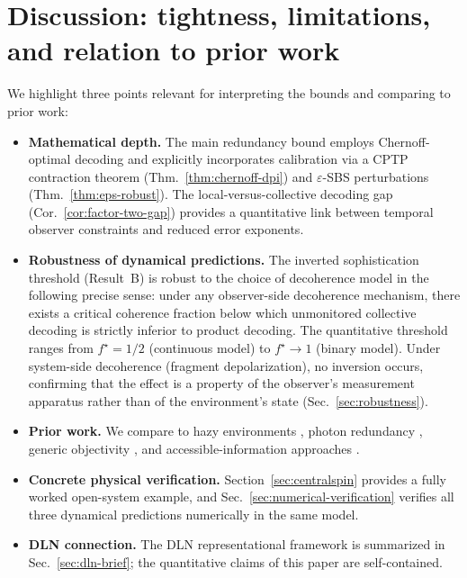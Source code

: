 \documentclass[11pt]{article}
\newcommand{\1}{\mathbf{1}}
\theoremstyle{definition}
\theoremstyle{plain}
\begin{document}
\section{Discussion: tightness, limitations, and relation to prior work}

We highlight three points relevant for interpreting the bounds and comparing to prior work:

\begin{itemize}[leftmargin=2em]
\item \textbf{Mathematical depth.}  The main redundancy bound employs Chernoff-optimal decoding \citep{Audenaert2007,NussbaumSzkola2009} and explicitly incorporates calibration via a CPTP contraction theorem (Thm.~\ref{thm:chernoff-dpi}) and $\varepsilon$-SBS perturbations (Thm.~\ref{thm:eps-robust}).
The local-versus-collective decoding gap (Cor.~\ref{cor:factor-two-gap}) provides a quantitative link between temporal observer constraints and reduced error exponents.
\item \textbf{Robustness of dynamical predictions.}  The inverted sophistication threshold (Result~B) is robust to the choice of decoherence model in the following precise sense: under any observer-side decoherence mechanism, there exists a critical coherence fraction below which unmonitored collective decoding is strictly inferior to product decoding.  The quantitative threshold ranges from $f^\star=1/2$ (continuous model) to $f^\star\to 1$ (binary model).  Under system-side decoherence (fragment depolarization), no inversion occurs, confirming that the effect is a property of the observer's measurement apparatus rather than of the environment's state (Sec.~\ref{sec:robustness}).
\item \textbf{Prior work.}  We compare to hazy environments \citep{ZwolakQuanZurek2009}, photon redundancy \citep{RiedelZurek2010,RiedelZurek2011}, generic objectivity \citep{BrandaoPianiHorodecki2015,Knott2018}, and accessible-information approaches \citep{Touil2022}.
\item \textbf{Concrete physical verification.}  Section~\ref{sec:centralspin} provides a fully worked open-system example, and Sec.~\ref{sec:numerical-verification} verifies all three dynamical predictions numerically in the same model.
\item \textbf{DLN connection.}  The DLN representational framework is summarized in Sec.~\ref{sec:dln-brief}; the quantitative claims of this paper are self-contained.
\end{itemize}
\end{document}
